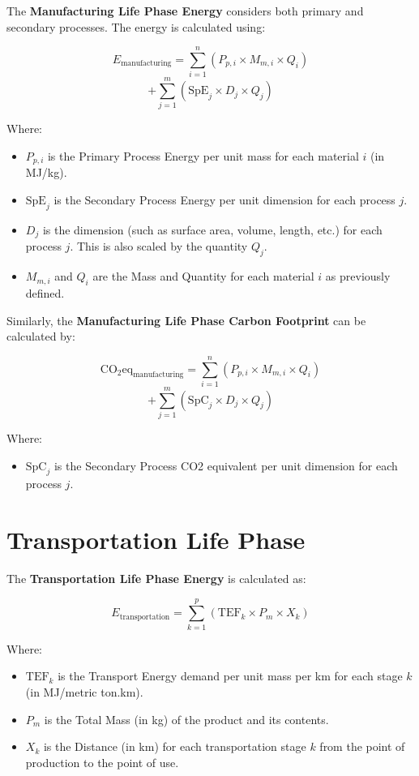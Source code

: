 \documentclass[a4paper, twocolumn]{article}
\begin{document}
The \textbf{Manufacturing Life Phase Energy} considers both primary and secondary processes. The energy is calculated using:

\[
E_{\text{manufacturing}} = \sum_{i=1}^{n} \left( P_{p,i} \times M_{m,i} \times Q_i \right)\]
\[  + \sum_{j=1}^{m} \left( \text{SpE}_j \times D_j \times Q_j \right)
\]

Where:
\begin{itemize}
    \item \( P_{p,i} \) is the Primary Process Energy per unit mass for each material \(i\) (in MJ/kg).
    \item \( \text{SpE}_j \) is the Secondary Process Energy per unit dimension for each process \(j\).
    \item \( D_j \) is the dimension (such as surface area, volume, length, etc.) for each process \(j\). This is also scaled by the quantity \(Q_j\).
    \item \( M_{m,i} \) and \( Q_i \) are the Mass and Quantity for each material \(i\) as previously defined.
\end{itemize}

Similarly, the \textbf{Manufacturing Life Phase Carbon Footprint} can be calculated by:

\[
\text{CO}_2\text{eq}_{\text{manufacturing}} = \sum_{i=1}^{n} \left( P_{p,i} \times M_{m,i} \times Q_i \right)\]
\[ + \sum_{j=1}^{m} \left( \text{SpC}_j \times D_j \times Q_j \right)
\]

Where:
\begin{itemize}
    \item \( \text{SpC}_j \) is the Secondary Process CO2 equivalent per unit dimension for each process \(j\).
\end{itemize}

\section*{Transportation Life Phase}

The \textbf{Transportation Life Phase Energy} is calculated as:

\[
E_{\text{transportation}} = \sum_{k=1}^{p} \left( \text{TEF}_k \times P_m \times X_k \right)
\]

Where:
\begin{itemize}
    \item \( \text{TEF}_k \) is the Transport Energy demand per unit mass per km for each stage \(k\) (in MJ/metric ton.km).
    \item \( P_m \) is the Total Mass (in kg) of the product and its contents.
    \item \( X_k \) is the Distance (in km) for each transportation stage \(k\) from the point of production to the point of use.
\end{itemize}
\end{document}
